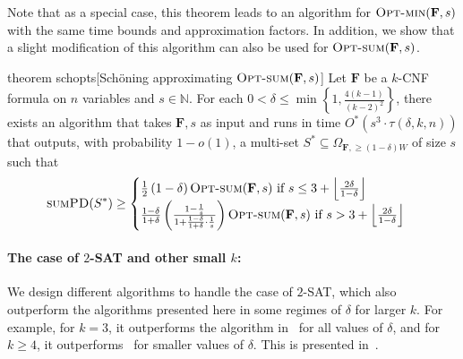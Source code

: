 \documentclass[11pt, letterpaper]{article}
\theoremstyle{definition}
\newcommand{\f}{\mathbf{F}}
\newcommand{\SPD}{\textsc{sumPD}}
\newcommand{\opts}{\textsc{Opt-sum}}
\newcommand{\optm}{\textsc{Opt-min}}
\newcommand{\sch}{Sch\"{o}ning\xspace}
\newcommand{\IN}{\ensuremath{\mathbb{N}}}
\newcommand{\floor}[1]{{\left\lfloor{#1}\right\rfloor}}
\begin{document}
Note that as a special case, this theorem leads to an algorithm for $\optm(\f,s)$ with the same time bounds and approximation factors. In addition, we show that a slight modification of this algorithm can also be used for $\opts(\f,s)$. 
\begin{restatable}{theorem} {schopts}[\sch approximating $\opts(\f,s)$]
\label{thm:sch-for-sumdisp}
    Let $\f$ be a $k$-CNF formula on $n$ variables and $s \in \IN$. For each $0 < \delta \leq \min \left \{1, \frac{4(k-1)}{(k-2)^2} \right \}$, there exists an algorithm that takes $\f,s$ as input and runs in time $O^*\left(s^3 \cdot \tau(\delta, k, n)\right)$ that outputs, with probability $1-o(1)$, a multi-set $S^* \subseteq \Omega_{\f, \geq (1-\delta) W}$ of size $s$ such that $$\SPD(S^*) \geq \begin{cases}
            \frac{1}{2}\left(1-\delta \right) \opts(\f,s) \text{ if }  s \leq 3+ \floor{ \frac{2 \delta}{1-\delta} } \\
            \frac{1-\delta}{1+\delta}\left(\frac{1-\frac{1}{s}}{1+\frac{1-\delta}{1+\delta} \cdot \frac{1}{s}}\right) \opts(\f,s) \text{ if } s > 3+ \floor{ \frac{2 \delta}{1-\delta} }
        \end{cases}$$ 
    
\end{restatable}
\paragraph{The case of $2$-SAT and other small $k$:} We design different algorithms to handle the case of $2$-SAT, which also outperform the algorithms presented here in some regimes of $\delta$ for larger $k$. For example, for $k=3$, it outperforms the algorithm in~ for all values of $\delta$, and for $k \geq 4$, it outperforms~ for smaller values of $\delta$. This is presented in~.
\end{document}
